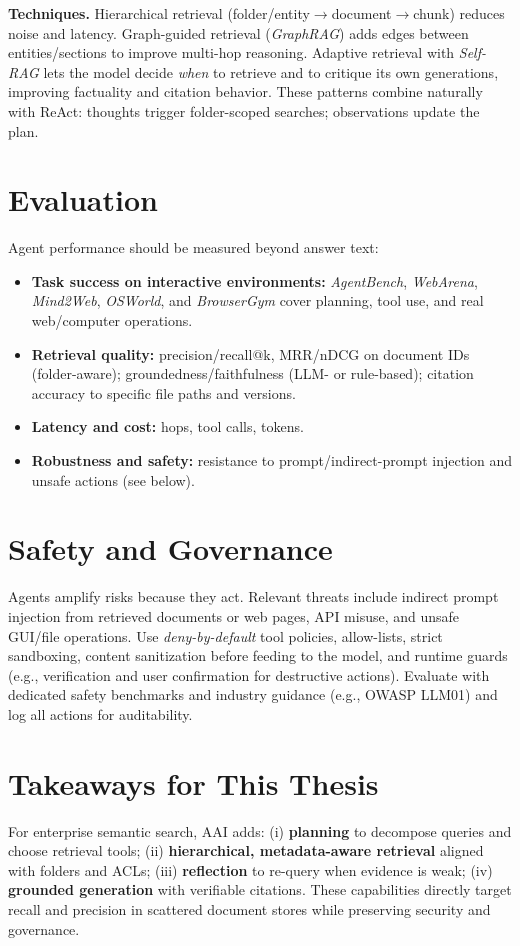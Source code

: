 \textbf{Techniques.} Hierarchical retrieval (folder/entity$\to$document$\to$chunk) reduces noise and latency. Graph-guided retrieval (\emph{GraphRAG}) adds edges between entities/sections to improve multi-hop reasoning. Adaptive retrieval with \emph{Self-RAG} lets the model decide \emph{when} to retrieve and to critique its own generations, improving factuality and citation behavior. These patterns combine naturally with ReAct: thoughts trigger folder-scoped searches; observations update the plan.

\section{Evaluation}
Agent performance should be measured beyond answer text:
\begin{itemize}\itemsep2pt
    \item \textbf{Task success on interactive environments:} \emph{AgentBench}, \emph{WebArena}, \emph{Mind2Web}, \emph{OSWorld}, and \emph{BrowserGym} cover planning, tool use, and real web/computer operations.
    \item \textbf{Retrieval quality:} precision/recall@k, MRR/nDCG on document IDs (folder-aware); groundedness/faithfulness (LLM- or rule-based); citation accuracy to specific file paths and versions.
    \item \textbf{Latency and cost:} hops, tool calls, tokens.
    \item \textbf{Robustness and safety:} resistance to prompt/indirect-prompt injection and unsafe actions (see below).
\end{itemize}

\section{Safety and Governance}
Agents amplify risks because they act. Relevant threats include indirect prompt injection from retrieved documents or web pages, API misuse, and unsafe GUI/file operations. Use \emph{deny-by-default} tool policies, allow-lists, strict sandboxing, content sanitization before feeding to the model, and runtime guards (e.g., verification and user confirmation for destructive actions). Evaluate with dedicated safety benchmarks and industry guidance (e.g., OWASP LLM01) and log all actions for auditability.

\section{Takeaways for This Thesis}
For enterprise semantic search, \ac{AAI} adds:
(i) \textbf{planning} to decompose queries and choose retrieval tools;
(ii) \textbf{hierarchical, metadata-aware retrieval} aligned with folders and ACLs;
(iii) \textbf{reflection} to re-query when evidence is weak;
(iv) \textbf{grounded generation} with verifiable citations. 
These capabilities directly target recall and precision in scattered document stores while preserving security and governance.
